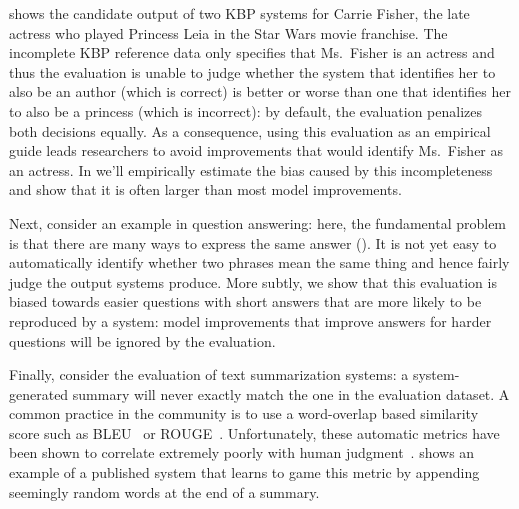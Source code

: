  shows the candidate output of two KBP systems for Carrie Fisher, the late actress who played Princess Leia in the Star Wars movie franchise.
The incomplete KBP reference data only specifies that Ms.\ Fisher is an actress and thus the evaluation is unable to judge whether the system that identifies her to also be an author (which is correct) is better or worse than one that identifies her to also be a princess (which is incorrect): by default, the evaluation penalizes both decisions equally.
As a consequence, using this evaluation as an empirical guide leads researchers to avoid improvements that would identify Ms.\ Fisher as an actress.
In  we'll empirically estimate the bias caused by this incompleteness and show that it is often larger than most model improvements.

Next, consider an example in question answering:
  here, the fundamental problem is that there are many ways to express the same answer ().
It is not yet easy to automatically identify whether two phrases mean the same thing and hence fairly judge the output systems produce.
More subtly, we show that this evaluation is biased towards easier questions with short answers that are more likely to be reproduced by a system:
  model improvements that improve answers for harder questions will be ignored by the evaluation.

Finally, consider the evaluation of text summarization systems: a system-generated summary will never exactly match the one in the evaluation dataset.
A common practice in the community is to use a word-overlap based similarity score such as BLEU~\citep{papineni02bleu} or ROUGE~\citep{lin2004rouge}\@.
Unfortunately, these automatic metrics have been shown to correlate extremely poorly with human judgment~\citep{novikova2017why}.
 shows an example of a published system that learns to game this metric by appending seemingly random words at the end of a summary.

